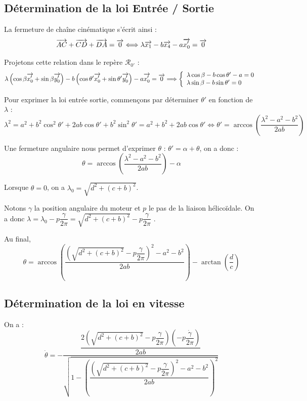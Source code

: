 \documentclass[10pt]{article}
\begin{document}
\subsection{Détermination de la loi Entrée / Sortie}

La fermeture de chaîne cinématique s'écrit ainsi : 
$$
\overrightarrow{AC}+\overrightarrow{CD}+\overrightarrow{DA}=\overrightarrow{0} 
\Longleftrightarrow
\lambda\overrightarrow{x_1} - b \overrightarrow{x_4} - a \overrightarrow{x_0'} = \overrightarrow{0}
$$

Projetons cette relation dans le repère $\mathcal{R}_{0'}$ :
$$
\lambda\left(\cos\beta \overrightarrow{x_0'}+\sin \beta \overrightarrow{y_0'} \right) 
- b \left(\cos\theta' \overrightarrow{x_0'}+\sin \theta' \overrightarrow{y_0'} \right) - a \overrightarrow{x_0'} = \overrightarrow{0}
\Longrightarrow 
\left\{
\begin{array}{l}
\lambda\cos\beta - b \cos\theta' - a  = 0 \\
\lambda\sin \beta - b \sin \theta' = 0
\end{array}
\right.
$$

Pour exprimer la loi entrée sortie, commençons par déterminer $\theta'$ en fonction de $\lambda$ : 
$$
\lambda^2 
=  a^2 +b^2\cos^2\theta' + 2ab\cos\theta'  + b^2\sin^2 \theta'
=  a^2 +b^2 + 2ab\cos\theta' 
\Longleftrightarrow 
\theta' = \arccos \left(\dfrac{\lambda^2 - a^2 - b^2 }{2ab} \right)
$$

Une fermeture angulaire nous permet d'exprimer $\theta$ : $\theta' = \alpha + \theta$, on a donc :
$$
\theta = \arccos \left(\dfrac{\lambda^2 - a^2 - b^2 }{2ab} \right) - \alpha
$$

Lorsque $\theta=0$, on a $\lambda_0 = \sqrt{d^2 + (c+b)^2}$.


Notons $\gamma$ la position angulaire du moteur et $p$ le pas de la liaison hélicoïdale. On a donc $\lambda = \lambda_0 - p \dfrac{\gamma}{2\pi}=\sqrt{d^2 + (c+b)^2} - p \dfrac{\gamma}{2\pi}$ .

Au final, 
$$
\theta = \arccos \left(\dfrac{\left( \sqrt{d^2 + (c+b)^2} - p \dfrac{\gamma}{2\pi}\right)^2 - a^2 - b^2 }{2ab} \right) - \arctan\left( \dfrac{d}{c}\right)
$$

\subsection{Détermination de la loi en vitesse}

On a :
$$
\dot{\theta} = -\dfrac{\dfrac{2\left( \sqrt{d^2 + (c+b)^2} - p \dfrac{\gamma}{2\pi}\right) \left( - p \dfrac{\dot{\gamma}}{2\pi}\right)  }{2ab} }{\sqrt{1-\left(\dfrac{\left( \sqrt{d^2 + (c+b)^2} - p \dfrac{\gamma}{2\pi}\right)^2 - a^2 - b^2 }{2ab} \right)^2}}
$$
\end{document}

